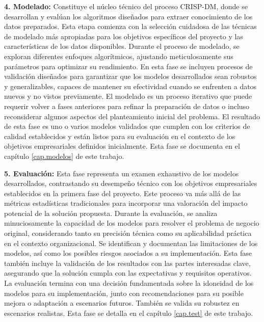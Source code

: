 \textbf{4. Modelado:} Constituye el núcleo técnico del proceso CRISP-DM, donde se desarrollan y evalúan los algoritmos diseñados para extraer conocimiento de los datos preparados. Esta etapa comienza con la selección cuidadosa de las técnicas de modelado más apropiadas para los objetivos específicos del proyecto y las características de los datos disponibles. Durante el proceso de modelado, se exploran diferentes enfoques algorítmicos, ajustando meticulosamente sus parámetros para optimizar su rendimiento. En esta fase se incluyen procesos de validación diseñados para garantizar que los modelos desarrollados sean robustos y generalizables, capaces de mantener su efectividad cuando se enfrenten a datos nuevos y no vistos previamente. El modelado es un proceso iterativo que puede requerir volver a fases anteriores para refinar la preparación de datos o incluso reconsiderar algunos aspectos del planteamiento inicial del problema. El resultado de esta fase es uno o varios modelos validados que cumplen con los criterios de calidad establecidos y están listos para su evaluación en el contexto de los objetivos empresariales definidos inicialmente. Esta fase se documenta en el capítulo \ref{cap.modelos}  de este trabajo.

\textbf{5. Evaluación:} Esta fase representa un examen exhaustivo de los modelos desarrollados, contrastando su desempeño técnico con los objetivos empresariales establecidos en la primera fase del proyecto. Este proceso va más allá de las métricas estadísticas tradicionales para incorporar una valoración del impacto potencial de la solución propuesta. Durante la evaluación, se analiza minuciosamente la capacidad de los modelos para resolver el problema de negocio original, considerando tanto su precisión técnica como su aplicabilidad práctica en el contexto organizacional. Se identifican y documentan las limitaciones de los modelos, así como los posibles riesgos asociados a su implementación. Esta fase también incluye la validación de los resultados con las partes interesadas clave, asegurando que la solución cumpla con las expectativas y requisitos operativos. La evaluación termina con una decisión fundamentada sobre la idoneidad de los modelos para su implementación, junto con recomendaciones para su posible mejora o adaptación a escenarios futuros. También se valida su robustez en escenarios realistas. Esta fase se detalla en el capítulo \ref{cap.test}  de este trabajo.

